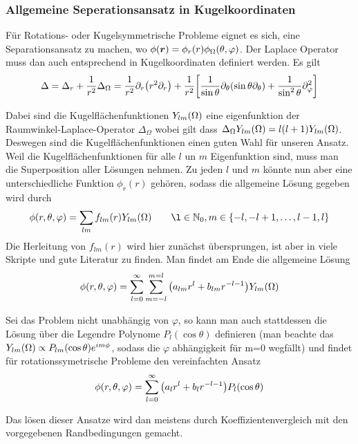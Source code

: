 \subsubsection{Allgemeine Seperationsansatz in Kugelkoordinaten}%
Für Rotations- oder Kugelsymmetrische Probleme eignet es sich, eine 
Separationsansatz zu machen, wo 
$\phi(\vb*r)=\phi_r(r)\phi_\Omega(\theta,\varphi)$.
Der Laplace Operator muss dan auch entsprechend in Kugelkoordinaten definiert
werden. Es gilt 
\begin{equation}
  \Delta=\Delta_r + \frac{1}{r^2}\Delta_\Omega=
  \frac{1}{r^2}\partial_{r} \qty(r^2\partial_{r}) + 
  \frac{1}{r^2}\qty[\frac{1}{\sin\theta}\partial_{\theta}\qty(\sin\theta\partial_{\theta})+
  \frac{1}{\sin^2\theta}\partial_{\varphi}^2] 
\end{equation}

Dabei sind die Kugelflächenfunktionen $Y_{lm}(\Omega)$ eine eigenfunktion der
Raumwinkel-Laplace-Operator $\Delta_\Omega$ wobei gilt dass
$\Delta_\Omega Y_{lm}(\Omega)=l(l+1)Y_{lm}(\Omega)$. Deswegen sind die Kugelflächenfunktionen einen
guten Wahl für unseren Ansatz. Weil die Kugelflächenfunktionen für alle
$l$ un $m$ Eigenfunktion sind, muss man die Superposition aller Lösungen
nehmen. Zu jeden $l$ und $m$ könnte nun aber eine unterschiedliche Funktion
$\phi_r(r)$ gehören, sodass die allgemeine Lösung gegeben wird durch
\begin{equation*}
  \phi(r,\theta,\varphi) = \sum_{lm} f_{lm}(r)\Y \qquad
  \l\in\mathbb{N}_0, m\in\{-l,-l+1,\ldots,l-1,l\}
\end{equation*}
Die Herleitung von $f_{lm}(r)$ wird hier zunächst übersprungen, ist aber
in viele Skripte und gute Literatur zu finden. Man findet am Ende die
allgemeine Lösung
\begin{equation}
  \phi(r,\theta,\varphi)=\sum_{l=0}^\infty\sum_{m=-l}^{m=l}
  \qty(a_{lm}r^l + b_{lm}r^{-l-1})Y_{lm}(\Omega)
\end{equation}

Sei das Problem nicht unabhängig von $\varphi$, so kann man auch stattdessen
die Lösung über die Legendre Polynome $P_l(\cos\theta)$ definieren 
(man beachte das $Y_{lm}(\Omega)\propto P_{lm}(\cos\theta)e^{im\phi}$, sodass die
$\varphi$ abhängigkeit für m=0 wegfällt) und findet für rotationssymetrische
Probleme den vereinfachten Ansatz
\begin{equation}
  \phi(r,\theta,\varphi)=\sum_{l=0}^\infty
  \qty(a_{l}r^l + b_{l}r^{-l-1})P_l(\cos\theta)
\end{equation}

Das lösen dieser Ansatze wird dan meistens durch Koeffizientenvergleich
mit den vorgegebenen Randbedingungen gemacht.
